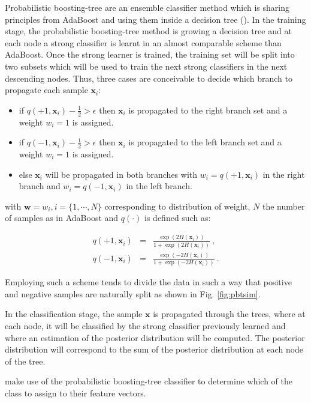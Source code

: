 \begin{enumerate}[leftmargin=*]
Probabilistic boosting-tree are an ensemble classifier method which is sharing principles from AdaBoost and using them inside a decision tree (\cite{Tu2005}). In the training stage, the probabilistic boosting-tree method is growing a decision tree and at each node a strong classifier is learnt in an almost comparable scheme than AdaBoost. Once the strong learner is trained, the training set will be split into two subsets which will be used to train the next strong classifiers in the next descending nodes. Thus, three cases are conceivable to decide which branch to propagate each sample $\mathbf{x}_i$:
\begin{itemize}
	\item if $q(+1, \mathbf{x}_i) - \frac{1}{2} > \epsilon$ then $\mathbf{x}_i$ is propagated to the right branch set and a weight $w_i=1$ is assigned. 
	\item if $q(-1, \mathbf{x}_i) - \frac{1}{2} > \epsilon$ then $\mathbf{x}_i$ is propagated to the left branch set and a weight $w_i=1$ is assigned.
	\item else $\mathbf{x}_i$ will be propagated in both branches with $w_i=q(+1, \mathbf{x}_i)$ in the right branch and $w_i=q(-1, \mathbf{x}_i)$ in the left branch.
\end{itemize}

\noindent with $\mathbf{w} = w_i, i=\{1,\cdots,N\}$ corresponding to distribution of weight, $N$ the number of samples as in AdaBoost and $q(\cdot)$ is defined such as:

\begin{eqnarray}
	q(+1, \mathbf{x}_i) & = & \frac{\exp(2H(\mathbf{x}_i))}{1+\exp(2H(\mathbf{x}_i))} \ , \label{eq:regada1} \\
	q(-1, \mathbf{x}_i) & = & \frac{\exp(-2H(\mathbf{x}_i))}{1+\exp(-2H(\mathbf{x}_i))} \ . \label{eq:regada2}
\end{eqnarray}

Employing such a scheme tends to divide the data in such a way that positive and negative samples are naturally split as shown in Fig. \ref{fig:pbtsim}.

In the classification stage, the sample $\mathbf{x}$ is propagated through the trees, where at each node, it will be classified by the strong classifier previously learned and where an estimation of the posterior distribution will be computed. The posterior distribution will correspond to the sum of the posterior distribution at each node of the tree.

\cite{Tiwari2009a,Tiwari2012,Tiwari2010,Viswanath2011} make use of the probabilistic boosting-tree classifier to determine which of the class to assign to their feature vectors.


\end{enumerate}
